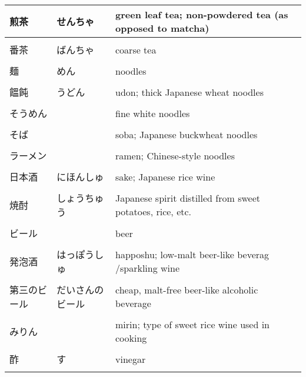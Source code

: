 \documentclass{article}
\begin{document}
\begin{tabular}{ l | l | p{11.5cm} }
煎茶            &せんちゃ                       &green leaf tea; non-powdered tea (as opposed to matcha) \\ \hline \\[-1em]							%
番茶            &ばんちゃ                       &coarse tea \\ \hline \\[-1em]																		%
麺              &めん                           &noodles \\ \hline \\[-1em]																		%
饂飩            &うどん                         &udon; thick Japanese wheat noodles \\ \hline \\[-1em] 					%
そうめん        &                               &fine white noodles \\ \hline \\[-1em]							
そば            &                               &soba; Japanese buckwheat noodles \\ \hline \\[-1em]
ラーメン        &                               &ramen; Chinese-style noodles \\ \hline \\[-1em]
日本酒          &にほんしゅ                     &sake; Japanese rice wine \\ \hline \\[-1em]															%
焼酎            &しょうちゅう                   &Japanese spirit distilled from sweet potatoes, rice, etc.   \\ \hline \\[-1em]						%
ビール          &                               &beer \\ \hline \\[-1em]
発泡酒          &はっぽうしゅ                   &happoshu; low-malt beer-like beverag /sparkling wine \\ \hline \\[-1em]
第三のビール    &だいさんのビール               &cheap, malt-free beer-like alcoholic beverage \\ \hline \\[-1em]
みりん          &                               &mirin; type of sweet rice wine used in cooking \\ \hline \\[-1em]
酢              &す                             &vinegar \\ \hline \\[-1em]																		%

\end{tabular}
\end{document}
